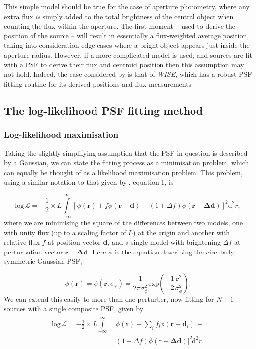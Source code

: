 \documentclass[fleqn,usenatbib]{mnras}
\begin{document}
This simple model should be true for the case of aperture photometry, where any extra flux \textit{is} simply added to the total brightness of the central object when counting the flux within the aperture. The first moment -- used to derive the position of the source -- will result in essentially a flux-weighted average position, taking into consideration edge cases where a bright object appears just inside the aperture radius. However, if a more complicated model is used, and sources are fit with a PSF to derive their flux and centroid position then this assumption may not hold. Indeed, the case considered by \citet{2018MNRAS.481.2148W} is that of \textit{WISE}, which has a robust PSF fitting routine for its derived positions and flux measurements.

\subsection{The log-likelihood PSF fitting method}
\subsubsection{Log-likelihood maximisation}
\label{sec:loglmax}
Taking the slightly simplifying assumption that the PSF in question is described by a Gaussian, we can state the fitting process as a minimisation problem, which can equally be thought of as a likelihood maximisation problem. This problem, using a similar notation to that given by \citet{2018MNRAS.476.4372}, equation 1, is

\begin{equation}
    \mathrm{log}\,\mathcal{L} = -\frac{1}{2}\times L \int\limits_{-\infty}^\infty\! \left[\phi(\mathbf{r}) + f\phi(\mathbf{r - d}) - (1 + \Delta f)\phi(\mathbf{r - \Delta d})\right]^2 \mathrm{d}^2r,
\label{eq:logL1}
\end{equation}
where we are minimising the square of the differences between two models, one with unity flux (up to a scaling factor of $L$) at the origin and another with relative flux $f$ at position vector $\mathbf{d}$, and a single model with brightening $\Delta f$ at perturbation vector $\mathbf{r - \Delta d}$. Here $\phi$ is the equation describing the circularly symmetric Gaussian PSF,

\begin{equation}
    \phi(\mathbf{r}) = \phi(\mathbf{r}, \sigma_\phi) = \frac{1}{2\pi \sigma_\phi^2}\mathrm{exp}\left(-\frac{1}{2} \frac{\mathbf{r}^2}{\sigma_\phi^2}\right).
\end{equation}
We can extend this easily to more than one perturber, now fitting for $N+1$ sources with a single composite PSF, given by
\begin{align}
\begin{split}
    \mathrm{log}\,\mathcal{L} = -\frac{1}{2}\times L \int\limits_{-\infty}^\infty\! \bigg[&\phi(\mathbf{r}) + \sum_i f_i\phi(\mathbf{r} - \mathbf{d}_i)\, - \\&(1 + \Delta f)\phi(\mathbf{r - \Delta d})\bigg]^2 \mathrm{d}^2r.
\label{eq:logL2}
\end{split}
\end{align}
\end{document}
